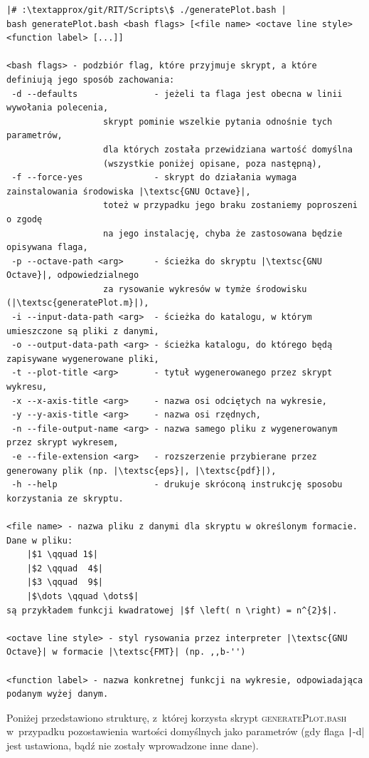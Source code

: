 \begin{verbatim}
|# :\textapprox/git/RIT/Scripts\$ ./generatePlot.bash |
bash generatePlot.bash <bash flags> [<file name> <octave line style> <function label> [...]]

<bash flags> - podzbiór flag, które przyjmuje skrypt, a które definiują jego sposób zachowania:
 -d --defaults               - jeżeli ta flaga jest obecna w linii wywołania polecenia, 
			       skrypt pominie wszelkie pytania odnośnie tych parametrów,
			       dla których została przewidziana wartość domyślna 
			       (wszystkie poniżej opisane, poza następną),
 -f --force-yes              - skrypt do działania wymaga zainstalowania środowiska |\textsc{GNU Octave}|, 
			       toteż w przypadku jego braku zostaniemy poproszeni o zgodę 
			       na jego instalację, chyba że zastosowana będzie opisywana flaga,
 -p --octave-path <arg>      - ścieżka do skryptu |\textsc{GNU Octave}|, odpowiedzialnego 
			       za rysowanie wykresów w tymże środowisku  (|\textsc{generatePlot.m}|),
 -i --input-data-path <arg>  - ścieżka do katalogu, w którym umieszczone są pliki z danymi,
 -o --output-data-path <arg> - ścieżka katalogu, do którego będą zapisywane wygenerowane pliki,
 -t --plot-title <arg>       - tytuł wygenerowanego przez skrypt wykresu,
 -x --x-axis-title <arg>     - nazwa osi odciętych na wykresie,
 -y --y-axis-title <arg>     - nazwa osi rzędnych,
 -n --file-output-name <arg> - nazwa samego pliku z wygenerowanym przez skrypt wykresem,
 -e --file-extension <arg>   - rozszerzenie przybierane przez generowany plik (np. |\textsc{eps}|, |\textsc{pdf}|),
 -h --help                   - drukuje skróconą instrukcję sposobu korzystania ze skryptu.

<file name> - nazwa pliku z danymi dla skryptu w określonym formacie. Dane w pliku:
	|$1	\qquad 1$|
	|$2 \qquad	4$|
	|$3 \qquad	9$|
	|$\dots \qquad \dots$|
są przykładem funkcji kwadratowej |$f \left( n \right) = n^{2}$|.

<octave line style> - styl rysowania przez interpreter |\textsc{GNU Octave}| w formacie |\textsc{FMT}| (np. ,,b-'')

<function label> - nazwa konkretnej funkcji na wykresie, odpowiadająca podanym wyżej danym.
\end{verbatim}

Poniżej przedstawiono strukturę, z~której korzysta skrypt \textsc{generatePlot.bash} w~przypadku pozostawienia wartości domyślnych jako parametrów (gdy flaga \texttt|-d| jest ustawiona, bądź nie zostały wprowadzone inne dane).

